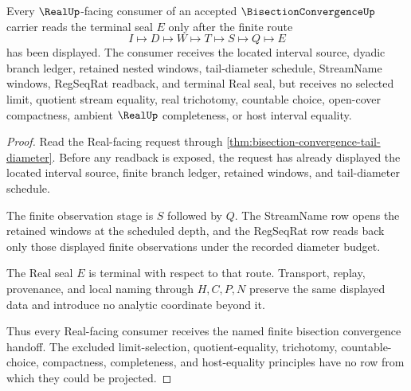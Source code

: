 \begin{theorem}
\label{thm:bisection-convergence-real-seal-handoff}
Every $\RealUp$-facing consumer of an accepted $\BisectionConvergenceUp$ carrier reads the terminal seal $E$ only after the finite route
$$
I \longmapsto D \longmapsto W \longmapsto T \longmapsto S \longmapsto Q \longmapsto E
$$
has been displayed. The consumer receives the located interval source, dyadic branch ledger, retained nested windows, tail-diameter schedule, StreamName windows, RegSeqRat readback, and terminal Real seal, but receives no selected limit, quotient stream equality, real trichotomy, countable choice, open-cover compactness, ambient $\RealUp$ completeness, or host interval equality.
\end{theorem}
\begin{proof}
Read the Real-facing request through \autoref{thm:bisection-convergence-tail-diameter}. Before any readback is exposed, the request has already displayed the located interval source, finite branch ledger, retained windows, and tail-diameter schedule.

The finite observation stage is $S$ followed by $Q$. The StreamName row opens the retained windows at the scheduled depth, and the RegSeqRat row reads back only those displayed finite observations under the recorded diameter budget.

The Real seal $E$ is terminal with respect to that route. Transport, replay, provenance, and local naming through $H,C,P,N$ preserve the same displayed data and introduce no analytic coordinate beyond it.

Thus every Real-facing consumer receives the named finite bisection convergence handoff. The excluded limit-selection, quotient-equality, trichotomy, countable-choice, compactness, completeness, and host-equality principles have no row from which they could be projected.
\end{proof}



